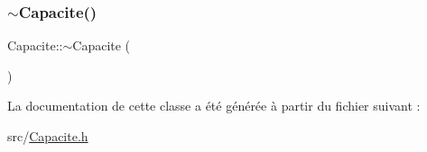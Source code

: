 \mbox{\label{class_capacite_a2224d62c03a73b7b34c0a5cb68c91279}} 
\subsubsection{\texorpdfstring{$\sim$\+Capacite()}{~Capacite()}}
{\footnotesize\ttfamily Capacite\+::$\sim$\+Capacite (\begin{DoxyParamCaption}{ }\end{DoxyParamCaption})}



La documentation de cette classe a été générée à partir du fichier suivant \+:\begin{DoxyCompactItemize}
\item 
src/\hyperlink{_capacite_8h}{Capacite.\+h}\end{DoxyCompactItemize}
